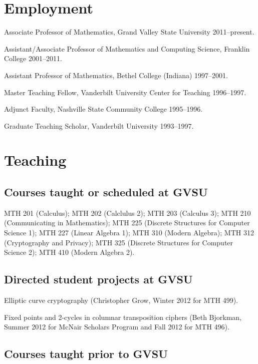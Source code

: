 \documentclass[letterpaper]{article}
\renewenvironment{itemize}{
  \begin{list}{}{
    \setlength{\leftmargin}{1.5em}
	\setlength{\itemsep}{0in}
  }
}{
  \end{list}
}
\begin{document}
\section*{Employment}

\begin{itemize}
\item Associate Professor of Mathematics, Grand Valley State University 2011--present. 	
\item Assistant/Associate Professor of Mathematics and Computing Science, Franklin College 2001--2011. 
\item Assistant Professor of Mathematics, Bethel College (Indiana) 1997--2001. 
\item Master Teaching Fellow, Vanderbilt University Center for Teaching 1996--1997. 
\item Adjunct Faculty, Nashville State Community College 1995--1996. 
\item Graduate Teaching Scholar, Vanderbilt University 1993--1997. 
\end{itemize}


\section*{Teaching}

\subsection*{Courses taught or scheduled at GVSU}
MTH 201 (Calculus); MTH 202 (Calclulus 2); MTH 203 (Calculus 3); MTH 210 (Communicating in Mathematics); MTH 225 (Discrete Structures for Computer Science 1); MTH 227 (Linear Algebra 1); MTH 310 (Modern Algebra); MTH 312 (Cryptography and Privacy); MTH 325 (Discrete Structures for Computer Science 2); MTH 410 (Modern Algebra 2). 
 

\subsection*{Directed student projects at GVSU}
\begin{itemize}
	\item Elliptic curve cryptography (Christopher Grow, Winter 2012 for MTH 499).
	\item Fixed points and 2-cycles in columnar transposition ciphers (Beth Bjorkman, Summer 2012 for McNair Scholars Program and Fall 2012 for MTH 496). 
\end{itemize}


\subsection*{Courses taught prior to GVSU}
\end{document}
